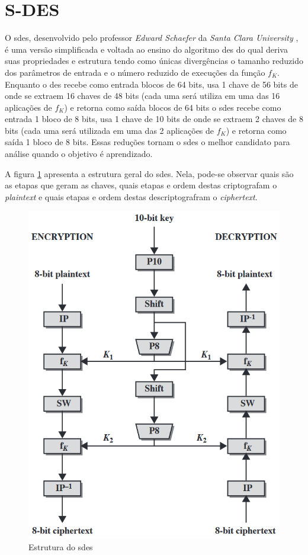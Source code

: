 \section{S-DES}
\label{sec:sdes}
O \acrfull{sdes}, desenvolvido pelo professor \textit{Edward Schaefer} da \textit{Santa Clara University} \cite{schaefer96}, é uma versão simplificada e voltada ao ensino do algoritmo \acrfull{des} do qual deriva suas propriedades e estrutura tendo como únicas divergências o tamanho reduzido dos parâmetros de entrada e o número reduzido de execuções da função \(f_K\). Enquanto o \acrshort{des} recebe como entrada blocos de 64 bits, usa 1 chave de 56 bits de onde se extraem 16 chaves de 48 bits (cada uma será utiliza em uma das 16 aplicações de \(f_K\)) e retorna como saída blocos de 64 bits o \acrshort{sdes} recebe como entrada 1 bloco de 8 bits, usa 1 chave de 10 bits de onde se extraem 2 chaves de 8 bits (cada uma será utilizada em uma das 2 aplicações de \(f_K\)) e retorna como saída 1 bloco de 8 bits. Essas reduções tornam o \acrshort{sdes} o melhor candidato para análise quando o objetivo é aprendizado. \cite{stallings10} \cite{stallings14}

A figura \ref{fig:sdesscheme} apresenta a estrutura geral do \acrshort{sdes}. Nela, pode-se observar quais são as etapas que geram as chaves, quais etapas e ordem destas criptografam o \textit{plaintext} e quais etapas e ordem destas descriptografram o \textit{ciphertext}.

\begin{figure}[H]
    \centering
    \caption{Estrutura do \acrshort{sdes}}
    \label{fig:sdesscheme}
    \includegraphics[width=.5\linewidth]{Figuras/SDESScheme.png}
\end{figure}

